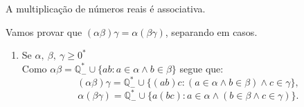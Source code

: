 \documentclass[../main.tex]{subfiles}
\begin{document}
\begin{prop}\label{reais-prop-produtoAssociativo}
    A multiplicação de números reais é associativa.
\end{prop}
\begin{dem}
    Vamos provar que $(\alpha\beta)\gamma = \alpha(\beta\gamma)$, separando em casos. 
    \begin{enumerate}
        \item Se $\alpha,\ \beta,\ \gamma \geq 0^*$ \\
            Como $\alpha\beta = \mathbb{Q}_{-}^* \cup \{ ab : a \in \alpha \land b \in \beta \}$ segue que: 
            \[ (\alpha\beta)\gamma = \mathbb{Q}_{-}^* \cup \{ (ab)c : (a \in \alpha \land b \in \beta) \land c \in \gamma \}, \]
            \[ \alpha(\beta\gamma) = \mathbb{Q}_{-}^* \cup \{ a(bc) : a \in \alpha \land (b \in \beta \land c \in \gamma) \}. \]
    

\end{enumerate}
\end{dem}
\end{document}
